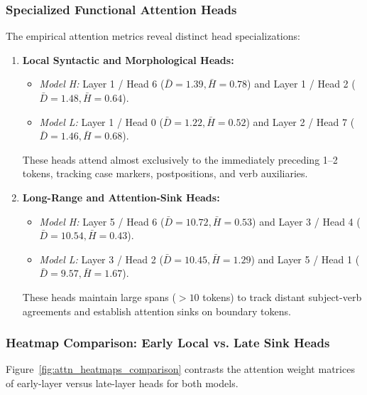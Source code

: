 \documentclass[8pt]{article}
\begin{document}
\subsubsection{Specialized Functional Attention Heads}
The empirical attention metrics reveal distinct head specializations:
\begin{enumerate}
    \item \textbf{Local Syntactic and Morphological Heads:}
    \begin{itemize}
        \item \textit{Model H:} Layer 1 / Head 6 ($\bar{D} = 1.39, \bar{H} = 0.78$) and Layer 1 / Head 2 ($\bar{D} = 1.48, \bar{H} = 0.64$).
        \item \textit{Model L:} Layer 1 / Head 0 ($\bar{D} = 1.22, \bar{H} = 0.52$) and Layer 2 / Head 7 ($\bar{D} = 1.46, \bar{H} = 0.68$).
    \end{itemize}
    These heads attend almost exclusively to the immediately preceding 1–2 tokens, tracking case markers, postpositions, and verb auxiliaries.
    \item \textbf{Long-Range and Attention-Sink Heads:}
    \begin{itemize}
        \item \textit{Model H:} Layer 5 / Head 6 ($\bar{D} = 10.72, \bar{H} = 0.53$) and Layer 3 / Head 4 ($\bar{D} = 10.54, \bar{H} = 0.43$).
        \item \textit{Model L:} Layer 3 / Head 2 ($\bar{D} = 10.45, \bar{H} = 1.29$) and Layer 5 / Head 1 ($\bar{D} = 9.57, \bar{H} = 1.67$).
    \end{itemize}
    These heads maintain large spans ($>10$ tokens) to track distant subject-verb agreements and establish attention sinks on boundary tokens.
\end{enumerate}


\subsubsection{Heatmap Comparison: Early Local vs. Late Sink Heads}
Figure~\ref{fig:attn_heatmaps_comparison} contrasts the attention weight matrices of early-layer versus late-layer heads for both models.
\end{document}
